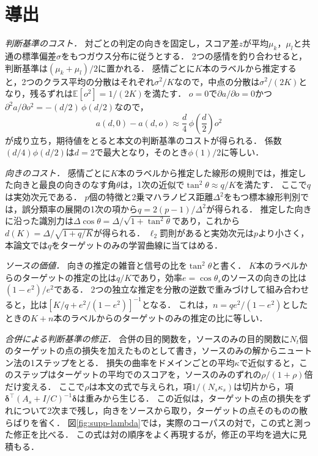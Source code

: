 \documentclass[paper=a4,fontsize=9.5pt,twocolumn,line_length=26zw,number_of_lines=50,head_space=17mm,baselineskip=1.55zw,column_gap=2zw]{jlreq}
\let\jaorigemph\emph
\renewcommand{\emph}[1]{\jaorigemph{\gtfamily #1}}
\begin{document}
\section{導出}
\label{sec:supp-derivations}

\emph{判断基準のコスト．}
対ごとの判定の向きを固定し，スコア差$z$が平均$\mu_k$，$\mu_l$と共通の標準偏差$\sigma$をもつガウス分布に従うとする．
2つの感情を釣り合わせると，判断基準は$(\mu_k + \mu_l)/2$に置かれる．
感情ごとに$K$本のラベルから推定すると，2つのクラス平均の分散はそれぞれ$\sigma^2/K$なので，中点の分散は$\sigma^2/(2K)$となり，残るずれは$\mathbb{E}[o^2] = 1/(2K)$を満たす．
$o=0$で$\partial a/\partial o = 0$かつ$\partial^2 a/\partial o^2 = -(d/2)\,\phi(d/2)$なので，
\begin{equation}
a(d, 0) - a(d, o) \approx \frac{d}{4}\,\phi\!\left(\frac{d}{2}\right) o^2
\end{equation}
が成り立ち，期待値をとると本文の判断基準のコストが得られる．
係数$(d/4)\phi(d/2)$は$d=2$で最大となり，そのとき$\phi(1)/2$に等しい．

\emph{向きのコスト．}
感情ごとに$K$本のラベルから推定した線形の規則では，推定した向きと最良の向きのなす角$\theta$は，1次の近似で$\tan^2\theta \approx q/K$を満たす．
ここで$q$は実効次元である．
$p$個の特徴と2乗マハラノビス距離$\Delta^2$をもつ標本線形判別では，誤分類率の展開の1次の項から$q = 2(p-1)/\Delta^2$が得られる\cite{okamoto1963asymptotic,raudys1998intrinsic}．
推定した向きに沿った識別力は$\Delta\cos\theta = \Delta/\sqrt{1 + \tan^2\theta}$であり，これから$d(K) = \Delta/\sqrt{1 + q/K}$が得られる．
$\ell_2$罰則があると実効次元は$p$より小さく，本論文では$q$をターゲットのみの学習曲線に当てはめる．

\emph{ソースの価値．}
向きの推定の雑音と信号の比を$\tan^2\theta$と書く．
$K$本のラベルからのターゲットの推定の比は$q/K$であり，効率$e = \cos\theta_s$のソースの向きの比は$(1-e^2)/e^2$である．
2つの独立な推定を分散の逆数で重みづけして組み合わせると，比は$\left[K/q + e^2/(1-e^2)\right]^{-1}$となる．
これは，$n = q e^2/(1-e^2)$としたときの$K + n$本のラベルからのターゲットのみの推定の比に等しい．

\emph{合併による判断基準の修正．}
合併の目的関数を，ソースのみの目的関数に$N_t$個のターゲットの点の損失を加えたものとして書き，ソースのみの解からニュートン法の1ステップをとる．
損失の曲率をドメインごとの平均$\kappa$で近似すると，このステップはターゲットの平均でのスコアを，ソースのみのずれの$\rho/(1+\rho)$倍だけ変える．
ここで$\rho$は本文の式で与えられ，項$1/(N_s\kappa_s)$は切片から，項$\boldsymbol{\delta}^\top(A_s + I/C)^{-1}\boldsymbol{\delta}$は重みから生じる．
この近似は，ターゲットの点の損失をずれについて2次まで残し，向きをソースから取り，ターゲットの点そのものの散らばりを省く．
図\ref{fig:supp-lambda}では，実際のコーパスの対で，この式と測った修正を比べる．
この式は対の順序をよく再現するが，修正の平均を過大に見積もる．
\end{document}
